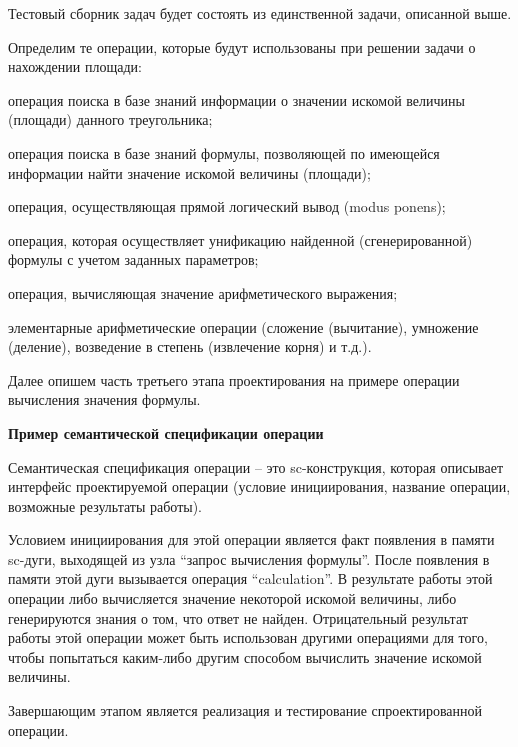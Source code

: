 Тестовый сборник задач будет состоять из единственной задачи, описанной выше.

Определим те операции, которые будут использованы при решении задачи о нахождении площади:

\begin{textitemize}
	\item операция поиска в базе знаний информации о значении искомой величины (площади) данного треугольника;
	\item операция поиска в базе знаний формулы, позволяющей по имеющейся информации найти значение искомой величины (площади);
	\item операция, осуществляющая прямой логический вывод (modus ponens);
	\item операция, которая осуществляет унификацию найденной (сгенерированной) формулы с учетом заданных параметров;
	\item операция, вычисляющая значение арифметического выражения;
	\item элементарные арифметические операции (сложение (вычитание), умножение (деление), возведение в степень (извлечение корня) и т.д.).
\end{textitemize}

Далее опишем часть третьего этапа проектирования на примере операции вычисления значения формулы.

\textbf{Пример семантической спецификации операции}

Семантическая спецификация операции -- это sc-конструкция, которая описывает интерфейс проектируемой операции (условие инициирования, название операции, возможные результаты работы).

Условием инициирования для этой операции является факт появле­ния в памяти sc-дуги, выходящей из узла ``запрос вычисления формулы''. После появления в памяти этой дуги вызывается операция ``calculation''. В результате работы этой операции либо вычисляется значение некоторой искомой величины, либо генерируются знания о том, что ответ не найден. Отрицательный результат работы этой операции может быть использован другими операциями для того, чтобы попытать­ся каким-либо другим способом вычислить значение искомой величины.

Завершающим этапом является реализация и тестирование спроектированной операции.

